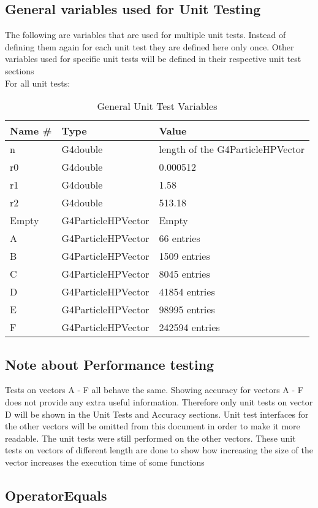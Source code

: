 \documentclass[12pt]{article}
\begin{document}
\subsection{General variables used for Unit Testing}
The following are variables that are used for multiple unit tests. Instead of defining them again for each unit test they are defined here only once. Other variables used for specific unit tests will be defined in their respective unit test sections\\
For all unit tests:
\begin{table}[!htbp]
\centering
\caption{General Unit Test Variables}\label{gen_var_table}
\begin{tabular}{lll}
\toprule
	\bf Name \# & Type & \bf Value\\\midrule
	 n 	& G4double 			& length of the G4ParticleHPVector\\
	r0 	& G4double 			& 0.000512\\
	r1	& G4double			& 1.58\\
	r2 	& G4double 			& 513.18\\
	Empty & G4ParticleHPVector 	& Empty\\
	A 	& G4ParticleHPVector	& 66 entries\\
	B 	& G4ParticleHPVector 	& 1509 entries\\
	C 	& G4ParticleHPVector 	& 8045 entries\\
	D 	& G4ParticleHPVector 	& 41854 entries\\
	E 	& G4ParticleHPVector 	& 98995 entries\\
	F 	& G4ParticleHPVector 	& 242594 entries\\
\bottomrule		
\end{tabular}
\end{table}
\subsection{Note about Performance testing}
Tests on vectors A - F all behave the same. Showing accuracy for vectors A - F does not provide any extra useful information. Therefore only unit tests on vector D will be shown in the Unit Tests and Accuracy sections. Unit test interfaces for the other vectors will be omitted from this document in order to make it more readable. The unit tests were still performed on the other vectors. These unit tests on vectors of different length are done to show how  increasing the size of the vector increases the execution time of some functions
\subsection{OperatorEquals}%
\end{document}
